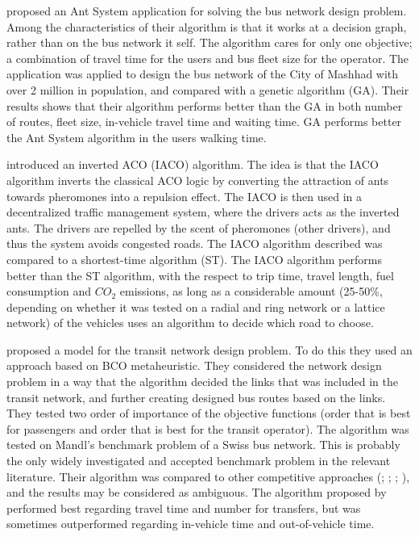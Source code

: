\citet{poorzahedy11} proposed an Ant System application for solving the bus network design problem. Among the characteristics of their algorithm is that it works at a decision graph, rather than on the bus network it self. The algorithm cares for only one objective; a combination of travel time for the users and bus fleet size for the operator. The application was applied to design the bus network of the City of Mashhad with over 2 million in population, and compared with a genetic algorithm (GA). Their results shows that their algorithm performs better than the GA in both number of routes, fleet size, in-vehicle travel time and waiting time. GA performs better the Ant System algorithm in the users walking time. 

\citet{dias14} introduced an inverted ACO (IACO) algorithm. The idea is that the IACO algorithm inverts the classical ACO logic by converting the attraction of ants towards pheromones into a repulsion effect. The IACO is then used in a decentralized traffic management system, where the drivers acts as the inverted ants. The drivers are repelled by the scent of pheromones (other drivers), and thus the system avoids congested roads. The IACO algorithm described was compared to a shortest-time algorithm (ST). The IACO algorithm performs better than the ST algorithm, with the respect to trip time, travel length, fuel consumption and $CO_2$ emissions, as long as a considerable amount (25-50\%, depending on whether it was tested on a radial and ring network or a lattice network) of the vehicles uses an algorithm to decide which road to choose. 

\citet{nikolic14} proposed a model for the transit network design problem. To do this they used an approach based on BCO metaheuristic. They considered the network design problem in a way that the algorithm decided the links that was included in the transit network, and further creating designed bus routes based on the links. They tested two order of importance of the objective functions (order that is best for passengers and order that is best for the transit operator). The algorithm was tested on Mandl's benchmark problem of a Swiss bus network\citep{mandl80}. This is probably the only widely investigated and accepted benchmark problem in the relevant literature\citep{kechagiopoulos14}. Their algorithm was compared to other competitive approaches (\citet{mandl80}; \citet{shih94}; \citet{baaj95}; \citet{bagloee11}), and the results may be considered as ambiguous. The algorithm proposed by \citet{nikolic14} performed best regarding travel time and number for transfers, but was sometimes outperformed regarding in-vehicle time and out-of-vehicle time. 

